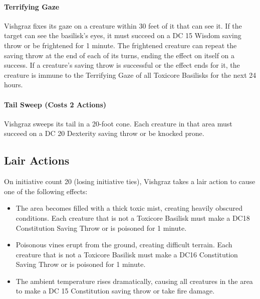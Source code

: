 \paragraph{Terrifying Gaze} Vishgraz fixes its gaze on a creature within 30 feet of it that can see it. If the target can see the basilisk's eyes, it must succeed on a DC 15 Wisdom saving throw or be frightened for 1 minute. The frightened creature can repeat the saving throw at the end of each of its turns, ending the effect on itself on a success. If a creature's saving throw is successful or the effect ends for it, the creature is immune to the Terrifying Gaze of all Toxicore Basilisks for the next 24 hours.
\paragraph{Tail Sweep (Costs 2 Actions)} Vishgraz sweeps its tail in a 20-foot cone. Each creature in that area must succeed on a DC 20 Dexterity saving throw or be knocked prone.

\subsection*{Lair Actions}
On initiative count 20 (losing initiative ties), Vishgraz takes a lair action to cause one of the following effects:
\begin{itemize}
	\item The area becomes filled with a thick toxic mist, creating heavily obscured conditions. Each creature that is not a Toxicore Basilisk must make a DC18 Constitution Saving Throw or is poisoned for 1 minute.
	\item Poisonous vines erupt from the ground, creating difficult terrain. Each creature that is not a Toxicore Basilisk must make a DC16 Constitution Saving Throw or is poisoned for 1 minute.
	\item  The ambient temperature rises dramatically, causing all creatures in the area to make a DC 15 Constitution saving throw or take  fire damage.
\end{itemize}

%
%
